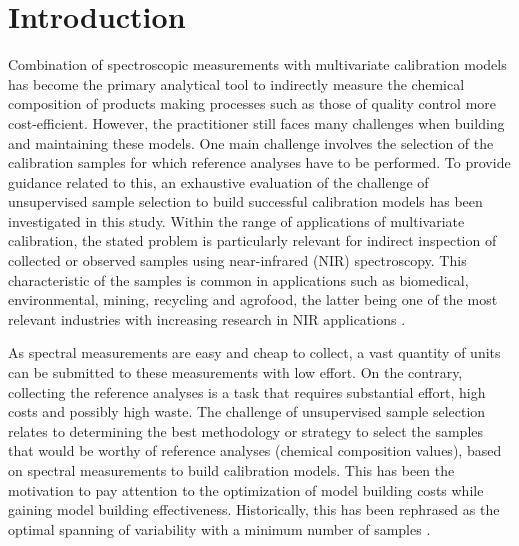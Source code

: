\documentclass[preprint,12pt]{elsarticle}
\begin{document}


\section{Introduction}\label{introduction}

Combination of spectroscopic measurements with multivariate calibration models has become the primary analytical tool to indirectly measure the chemical composition of products making processes such as those of quality control more cost-efficient. However, the practitioner still faces many challenges when building and maintaining these models. One main challenge involves the selection of the calibration samples for which reference analyses have to be performed. To provide guidance related to this, an exhaustive evaluation of the challenge of unsupervised sample selection to build successful calibration models has been investigated in this study. Within the range of applications of multivariate calibration, the stated problem is particularly relevant for indirect inspection of collected or observed samples using near-infrared (NIR) spectroscopy. This characteristic of the samples is common in applications such as biomedical, environmental, mining, recycling and agrofood, the latter being one of the most relevant industries with increasing research in NIR applications \cite{Au2020,Diaz-Olivares2020, Saeys2005, Bobelyn2010}.

As spectral measurements are easy and cheap to collect, a vast quantity of units can be submitted to these measurements with low effort. On the contrary, collecting the reference analyses is a task that requires substantial effort, high costs and possibly high waste. The challenge of unsupervised sample selection relates to determining the best methodology or strategy to select the samples that would be worthy of reference analyses (chemical composition values), based on spectral measurements to build calibration models.
This has been the motivation to pay attention to the optimization of model building costs while gaining model building effectiveness. Historically, this has been rephrased as the optimal spanning of variability with a minimum number of samples \cite{Naes1990, Saeys2019,Kennard1969}.
\end{document}
